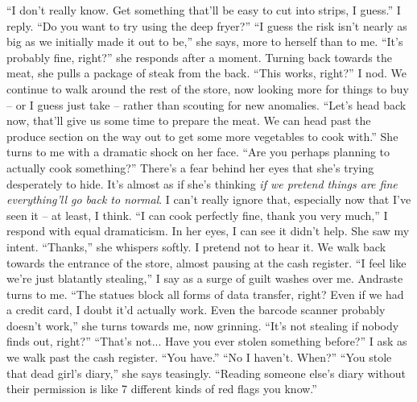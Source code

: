 \documentclass[a4paper, 12pt]{book}
\newcommand\tab[1][1cm]{\hspace*{#1}}
\begin{document}
\tab
``I don’t really know. Get something that’ll be easy to cut into strips, I guess.'' I reply. ``Do you want to try using the deep fryer?''
\newline
\tab
``I guess the risk isn’t nearly as big as we initially made it out to be,'' she says, more to herself than to me. ``It’s probably fine, right?'' she responds after a moment. Turning back towards the meat, she pulls a package of steak from the back. ``This works, right?'' I nod. We continue to walk around the rest of the store, now looking more for things to buy -- or I guess just take -- rather than scouting for new anomalies.
\newline
\tab
``Let’s head back now, that’ll give us some time to prepare the meat. We can head past the produce section on the way out to get some more vegetables to cook with.'' 
\newline
\tab
She turns to me with a dramatic shock on her face. ``Are you perhaps planning to actually cook something?''
\newline
\tab
There’s a fear behind her eyes that she’s trying desperately to hide. It’s almost as if she’s thinking \textit{if we pretend things are fine everything’ll go back to normal}. I can’t really ignore that, especially now that I’ve seen it -- at least, I think. ``I can cook perfectly fine, thank you very much,'' I respond with equal dramaticism. In her eyes, I can see it didn’t help. She saw my intent. 
\newline
\tab
``Thanks,'' she whispers softly. I pretend not to hear it.
\newline
\tab
We walk back towards the entrance of the store, almost pausing at the cash register. ``I feel like we’re just blatantly stealing,'' I say as a surge of guilt washes over me.
\newline
\tab
Andraste turns to me. ``The statues block all forms of data transfer, right? Even if we had a credit card, I doubt it’d actually work. Even the barcode scanner probably doesn’t work,'' she turns towards me, now grinning. ``It’s not stealing if nobody finds out, right?''
\newline
\tab
``That’s not... Have you ever stolen something before?'' I ask as we walk past the cash register.
\newline
\tab
``You have.''
\newline
\tab
``No I haven’t. When?''
\newline
\tab
``You stole that dead girl’s diary,'' she says teasingly. ``Reading someone else’s diary without their permission is like 7 different kinds of red flags you know.''
\end{document}

